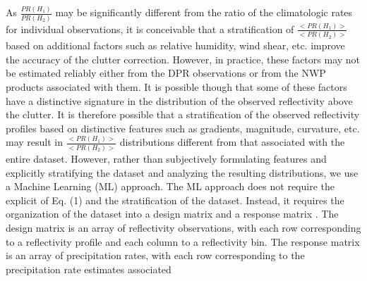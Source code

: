 \documentclass{article}
\begin{document}
As $\frac {PR(H_1)} {PR(H_2)}$ may be significantly different from
the ratio of the climatologic rates for individual observations, it is
conceivable that a stratification of $\frac {<PR(H_1)>} {<PR(H_2)>}$
based on additional factors such as relative humidity, wind shear, etc.
improve the accuracy of the clutter correction. However, in practice,
these factors may not be estimated reliably either from the DPR
observations or from the NWP products associated with them. It is 
possible though that some of these factors have a distinctive signature
in the distribution of the observed reflectivity above the clutter. It
is therefore possible that a stratification of the observed reflectivity
profiles based on distinctive features such as gradients, magnitude, 
curvature, etc. may result in $\frac {<PR(H_1)>} {<PR(H_2)>}$
distributions different from that associated with the entire dataset. 
However, rather than subjectively formulating features and explicitly
stratifying the dataset and analyzing the resulting distributions, we
use a Machine Learning (ML) approach.  The ML approach does not require
the explicit of Eq. (1) and the stratification of the dataset. Instead,
it requires the organization of the dataset into a design matrix and a
response matrix \cite{bishop2006}. The design matrix is an array of 
reflectivity observations, with each row corresponding to a reflectivity
profile and each column to a reflectivity bin. The response matrix is an
array of precipitation rates, with each row corresponding to the
precipitation rate estimates associated 
\end{document}
